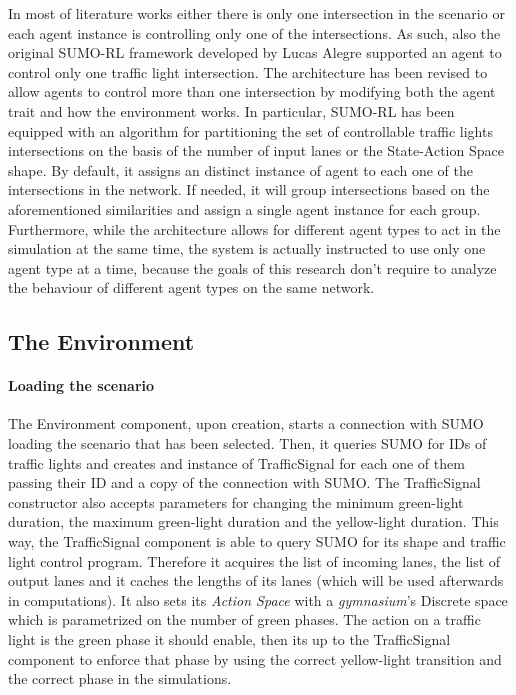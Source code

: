 In most of literature works either there is only one intersection in the scenario or each agent instance is controlling only one of the intersections. As such, also the original SUMO-RL framework \cite{sumorl} developed by Lucas Alegre supported an agent to control only one traffic light intersection.
The architecture has been revised to allow agents to control more than one intersection by modifying both the agent trait and how the environment works.
In particular, SUMO-RL has been equipped with an algorithm for partitioning the set of controllable traffic lights intersections on the basis of the number of input lanes or the State-Action Space shape.
By default, it assigns an distinct instance of agent to each one of the intersections in the network. If needed, it will group intersections based on the aforementioned similarities and assign a single agent instance for each group.
Furthermore, while the architecture allows for different agent types to act in the simulation at the same time, the system is actually instructed to use only one agent type at a time, because the goals of this research don't require to analyze the behaviour of different agent types on the same network.


\subsection{The Environment}


\paragraph{Loading the scenario}

The Environment component, upon creation, starts a connection with SUMO loading the scenario that has been selected. Then, it queries SUMO for IDs of traffic lights and creates and instance of TrafficSignal for each one of them passing their ID and a copy of the connection with SUMO.
The TrafficSignal constructor also accepts parameters for changing the minimum green-light duration, the maximum green-light duration and the yellow-light duration.
This way, the TrafficSignal component is able to query SUMO for its shape and traffic light control program.
Therefore it acquires the list of incoming lanes, the list of output lanes and it caches the lengths of its lanes (which will be used afterwards in computations).
It also sets its \textit{Action Space} with a \textit{gymnasium}'s Discrete space which is parametrized on the number of green phases.
The action on a traffic light is the green phase it should enable, then its up to the TrafficSignal component to enforce that phase by using the correct yellow-light transition and the correct phase in the simulations.


